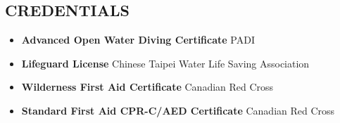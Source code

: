 \documentclass[11pt,letterpaper,sans]{moderncv}        %
\begin{document}
\subsection{CREDENTIALS}
\begin{itemize}

\item{\textbf{Advanced Open Water Diving Certificate} PADI}
\item{\textbf{Lifeguard License} Chinese Taipei Water Life Saving Association}
\item{\textbf{Wilderness First Aid Certificate} Canadian Red Cross}
\item{\textbf{Standard First Aid CPR-C/AED Certificate} Canadian Red Cross}

\end{itemize}
\end{document}
